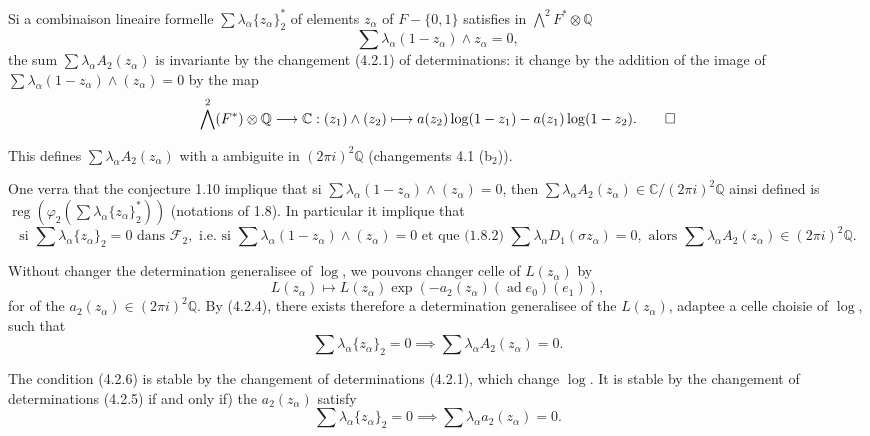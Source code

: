 \documentclass[12pt,a4paper]{article}
\theoremstyle{plain}
\theoremstyle{definition}
\theoremstyle{remark}
\DeclareMathOperator{\reg}{reg}
\DeclareMathOperator{\ad}{ad}
\newcommand{\Q}{\mathbb{Q}}
\newcommand{\C}{\mathbb{C}}
\newcommand{\F}{\mathcal{F}}
\begin{document}
{{Si a combinaison lineaire formelle $\sum\lambda_\alpha\{z_\alpha\}_2^*$ of elements $z_\alpha$ of $F-\{0,1\}$ satisfies in $\bigwedge^2 F^*\otimes\Q$
\begin{equation}\label{eq:4.2.3}
\sum\lambda_\alpha(1-z_\alpha)\wedge z_\alpha = 0,\tag{4.2.3}
\end{equation}
the sum $\sum\lambda_\alpha A_2(z_\alpha)$ is invariante by the changement (4.2.1) of determinations: it change by the addition of the image of $\sum\lambda_\alpha(1-z_\alpha)\wedge(z_\alpha)=0$ by the map
\begin{equation*}
\bigwedge^2(F^*)\otimes\Q \longrightarrow \C: (z_1)\wedge(z_2) \longmapsto a(z_2)\log(1-z_1)-a(z_1)\log(1-z_2).\qedhere
\end{equation*}

This defines $\sum\lambda_\alpha A_2(z_\alpha)$ with a ambiguite in $(2\pi i)^2\Q$ (changements 4.1 (b$_2$)).

One verra that the conjecture 1.10 implique that si $\sum\lambda_\alpha(1-z_\alpha)\wedge(z_\alpha)=0$, then $\sum\lambda_\alpha A_2(z_\alpha)\in\C/(2\pi i)^2\Q$ ainsi defined is $\reg(\varphi_2(\sum\lambda_\alpha\{z_\alpha\}_2^*))$ (notations of 1.8). In particular it implique that
\begin{equation}\label{eq:4.2.4}
\text{si }\sum\lambda_\alpha\{z_\alpha\}_2=0\text{ dans }\F_2,\text{ i.e. si }\sum\lambda_\alpha(1-z_\alpha)\wedge(z_\alpha)=0\text{ et que (1.8.2) }\sum\lambda_\alpha D_1(\sigma z_\alpha)=0,\text{ alors }\sum\lambda_\alpha A_2(z_\alpha)\in(2\pi i)^2\Q.\tag{4.2.4}
\end{equation}

Without changer the determination generalisee of $\log$, we pouvons changer celle of $L(z_\alpha)$ by
\begin{equation}\label{eq:4.2.5}
L(z_\alpha) \longmapsto L(z_\alpha)\exp(-a_2(z_\alpha)(\ad e_0)(e_1)),\tag{4.2.5}
\end{equation}
for of the $a_2(z_\alpha)\in(2\pi i)^2\Q$. By (4.2.4), there exists therefore a determination generalisee of the $L(z_\alpha)$, adaptee {a} celle choisie of $\log$, such that
\begin{equation}\label{eq:4.2.6}
\sum\lambda_\alpha\{z_\alpha\}_2=0 \implies \sum\lambda_\alpha A_2(z_\alpha)=0.\tag{4.2.6}
\end{equation}

The condition (4.2.6) is stable by the changement of determinations (4.2.1), which change $\log$. It is stable by the changement of determinations (4.2.5) if and only if) the $a_2(z_\alpha)$ satisfy
\begin{equation}\label{eq:4.2.7}
\sum\lambda_\alpha\{z_\alpha\}_2=0 \implies \sum\lambda_\alpha a_2(z_\alpha)=0.\tag{4.2.7}
\end{equation}

}}
\end{document}
